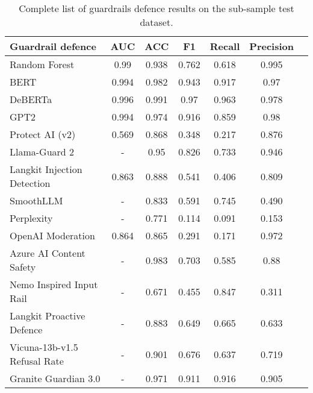 \begin{table}[t]\centering
\scriptsize
\begin{tabular}{lcccccc}\toprule
Guardrail defence &AUC &ACC &F1 &Recall &Precision \\ \midrule
Random Forest & 0.99 & 0.938 & 0.762 & 0.618 & 0.995\\
\rowcolor{gray!7} BERT & 0.994 & 0.982 & 0.943 & 0.917 & 0.97\\
DeBERTa & 0.996 & 0.991 & 0.97 & 0.963 & 0.978\\
\rowcolor{gray!7} GPT2 & 0.994 & 0.974 & 0.916 & 0.859 & 0.98\\
Protect AI (v2) & 0.569 & 0.868 & 0.348 & 0.217 & 0.876\\
\rowcolor{gray!7} Llama-Guard 2 & -  & 0.95 & 0.826 & 0.733 & 0.946\\
Langkit Injection Detection & 0.863 & 0.888 & 0.541 & 0.406 & 0.809\\
\rowcolor{gray!7} SmoothLLM & -  & 0.833 & 0.591 & 0.745 & 0.490\\
Perplexity & -  & 0.771 & 0.114 & 0.091 & 0.153\\
\rowcolor{gray!7} OpenAI Moderation & 0.864 & 0.865 & 0.291 & 0.171 & 0.972\\
Azure AI Content Safety & -  & 0.983 & 0.703 & 0.585 & 0.88\\
\rowcolor{gray!7} Nemo Inspired Input Rail & -  & 0.671 & 0.455 & 0.847 & 0.311\\
Langkit Proactive Defence & -  & 0.883 & 0.649 & 0.665 & 0.633\\
\rowcolor{gray!7} Vicuna-13b-v1.5 Refusal Rate & -  & 0.901 & 0.676 & 0.637 & 0.719\\
Granite Guardian 3.0& -  & 0.971 & 0.911 & 0.916 & 0.905\\
\bottomrule\end{tabular}\caption{Complete list of guardrails defence results on the sub-sample test dataset.}
\label{tab:sub_sample_aggregate_results}
\end{table}